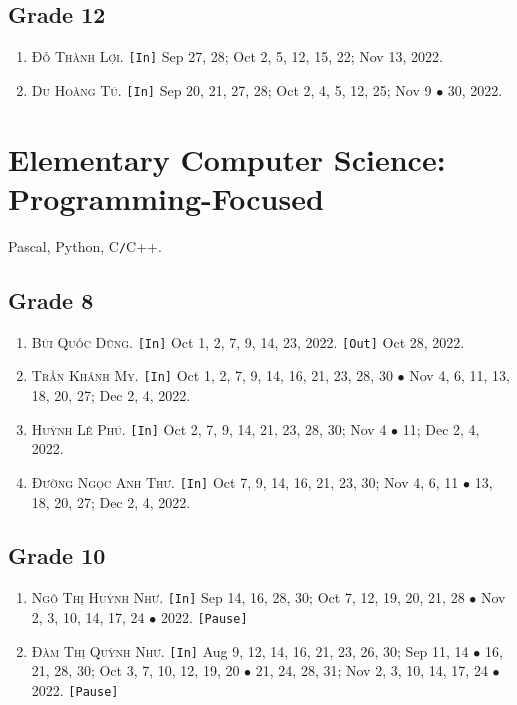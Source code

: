 \documentclass{article}
\numberwithin{equation}{section}
\begin{document}
\subsection{Grade 12}
\begin{enumerate}
	\item \textsc{Đỗ Thành Lợi.} \texttt{[In]} Sep 27, 28; Oct 2, 5, 12, 15, 22; Nov 13, 2022.
	\item \textsc{Du Hoàng Tú.} \texttt{[In]} Sep 20, 21, 27, 28; Oct 2, 4, 5, 12, 25; Nov 9 $\bullet$ 30, 2022.
\end{enumerate}


\section{Elementary Computer Science: Programming-Focused}
Pascal, Python, C\texttt{/}C++.

\subsection{Grade 8}
\begin{enumerate}
	\item \textsc{Bùi Quốc Dũng.} \texttt{[In]} Oct 1, 2, 7, 9, 14, 23, 2022. \texttt{[Out]} Oct 28, 2022.
	\item \textsc{Trần Khánh My.} \texttt{[In]} Oct 1, 2, 7, 9, 14, 16, 21, 23, 28, 30 $\bullet$ Nov 4, 6, 11, 13, 18, 20, 27; Dec 2, 4, 2022.
	\item \textsc{Huỳnh Lê Phú.} \texttt{[In]} Oct 2, 7, 9, 14, 21, 23, 28, 30; Nov 4 $\bullet$ 11; Dec 2, 4, 2022.
	\item \textsc{Đường Ngọc Anh Thư.} \texttt{[In]} Oct 7, 9, 14, 16, 21, 23, 30; Nov 4, 6, 11 $\bullet$ 13, 18, 20, 27; Dec 2, 4, 2022.
\end{enumerate}

\subsection{Grade 10}
\begin{enumerate}
	\item \textsc{Ngô Thị Huỳnh Như.} \texttt{[In]} Sep 14, 16, 28, 30; Oct 7, 12, 19, 20, 21, 28 $\bullet$ Nov 2, 3, 10, 14, 17, 24 $\bullet$ 2022. \texttt{[Pause]}
	\item \textsc{Đàm Thị Quỳnh Như.} \texttt{[In]} Aug 9, 12, 14, 16, 21, 23, 26, 30; Sep 11, 14 $\bullet$ 16, 21, 28, 30; Oct 3, 7, 10, 12, 19, 20 $\bullet$ 21, 24, 28, 31; Nov 2, 3, 10, 14, 17, 24 $\bullet$ 2022. \texttt{[Pause]}
\end{enumerate}
\end{document}

